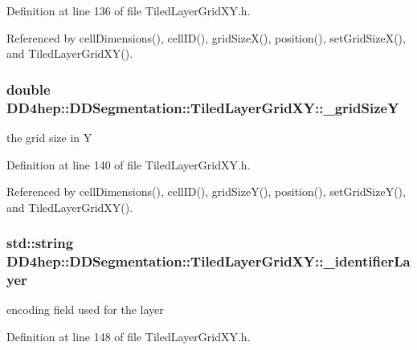 Definition at line 136 of file TiledLayerGridXY.h.

Referenced by cellDimensions(), cellID(), gridSizeX(), position(), setGridSizeX(), and TiledLayerGridXY().\hypertarget{class_d_d4hep_1_1_d_d_segmentation_1_1_tiled_layer_grid_x_y_ae544578762aec1e7bb735efca00a28b9}{
\subsubsection[{\_\-gridSizeY}]{\setlength{\rightskip}{0pt plus 5cm}double {\bf DD4hep::DDSegmentation::TiledLayerGridXY::\_\-gridSizeY}}}
\label{class_d_d4hep_1_1_d_d_segmentation_1_1_tiled_layer_grid_x_y_ae544578762aec1e7bb735efca00a28b9}


the grid size in Y 

Definition at line 140 of file TiledLayerGridXY.h.

Referenced by cellDimensions(), cellID(), gridSizeY(), position(), setGridSizeY(), and TiledLayerGridXY().\hypertarget{class_d_d4hep_1_1_d_d_segmentation_1_1_tiled_layer_grid_x_y_a4dfef8cb6d1319b076579fd565241c84}{
\subsubsection[{\_\-identifierLayer}]{\setlength{\rightskip}{0pt plus 5cm}std::string {\bf DD4hep::DDSegmentation::TiledLayerGridXY::\_\-identifierLayer}}}
\label{class_d_d4hep_1_1_d_d_segmentation_1_1_tiled_layer_grid_x_y_a4dfef8cb6d1319b076579fd565241c84}


encoding field used for the layer 

Definition at line 148 of file TiledLayerGridXY.h.

